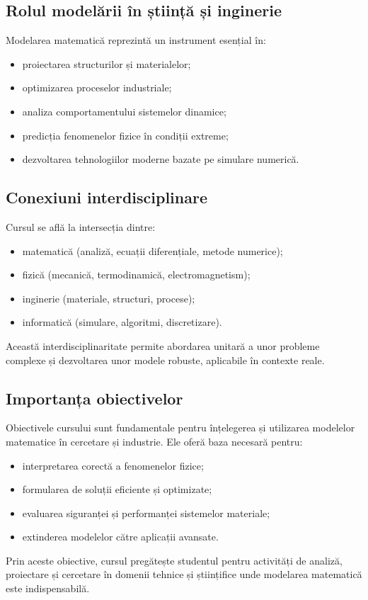 \documentclass[12pt,a4paper]{article}
\begin{document}
\subsection{Rolul modelării în știință și inginerie}

Modelarea matematică reprezintă un instrument esențial în:
\begin{itemize}
    \item proiectarea structurilor și materialelor;
    \item optimizarea proceselor industriale;
    \item analiza comportamentului sistemelor dinamice;
    \item predicția fenomenelor fizice în condiții extreme;
    \item dezvoltarea tehnologiilor moderne bazate pe simulare numerică.
\end{itemize}

\subsection{Conexiuni interdisciplinare}

Cursul se află la intersecția dintre:
\begin{itemize}
    \item matematică (analiză, ecuații diferențiale, metode numerice);
    \item fizică (mecanică, termodinamică, electromagnetism);
    \item inginerie (materiale, structuri, procese);
    \item informatică (simulare, algoritmi, discretizare).
\end{itemize}

Această interdisciplinaritate permite abordarea unitară a unor probleme complexe și dezvoltarea unor modele robuste, aplicabile în contexte reale.

\subsection{Importanța obiectivelor}

Obiectivele cursului sunt fundamentale pentru înțelegerea și utilizarea modelelor matematice în cercetare și industrie. Ele oferă baza necesară pentru:
\begin{itemize}
    \item interpretarea corectă a fenomenelor fizice;
    \item formularea de soluții eficiente și optimizate;
    \item evaluarea siguranței și performanței sistemelor materiale;
    \item extinderea modelelor către aplicații avansate.
\end{itemize}

Prin aceste obiective, cursul pregătește studentul pentru activități de analiză, proiectare și cercetare în domenii tehnice și științifice unde modelarea matematică este indispensabilă.
\end{document}
